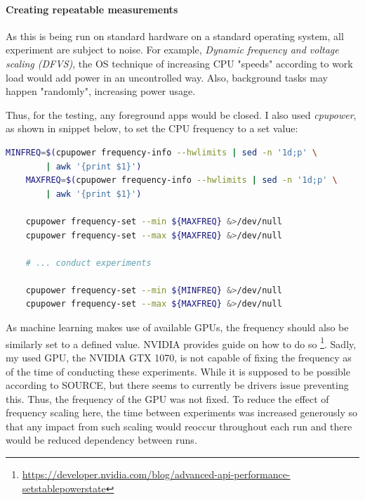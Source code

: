 \paragraph{Creating repeatable measurements}

As this is being run on standard hardware on a standard operating system, all experiment are subject to noise. 
For example, \emph{Dynamic frequency and voltage scaling (DFVS)}, the OS technique of increasing CPU "speeds" according to work load would add power in an uncontrolled way. Also, background tasks may happen "randomly", increasing power usage. 

Thus, for the testing, any foreground apps would be closed. I also used \emph{cpupower}, as shown in snippet below, to set the CPU frequency to a set value:

\begin{lstlisting}[language=bash, frame=single, numbers=none, caption={Used operating system information}, basicstyle=\ttfamily]
    MINFREQ=$(cpupower frequency-info --hwlimits | sed -n '1d;p' \
        | awk '{print $1}')
    MAXFREQ=$(cpupower frequency-info --hwlimits | sed -n '1d;p' \
        | awk '{print $1}')
    
    cpupower frequency-set --min ${MAXFREQ} &>/dev/null
    cpupower frequency-set --max ${MAXFREQ} &>/dev/null

    # ... conduct experiments

    cpupower frequency-set --min ${MINFREQ} &>/dev/null
    cpupower frequency-set --max ${MAXFREQ} &>/dev/null
\end{lstlisting}
\label{listing:setting_cpu_frequency}

As machine learning makes use of available GPUs, the frequency should also be similarly set to a defined value. 
NVIDIA provides guide on how to do so \footnote{\url{https://developer.nvidia.com/blog/advanced-api-performance-setstablepowerstate}}.
Sadly, my used GPU, the NVIDIA GTX 1070, is not capable of fixing the frequency as of the time of conducting these experiments. 
While it is supposed to be possible according to SOURCE, but there seems to currently be drivers issue preventing this. 
Thus, the frequency of the GPU was not fixed. 
To reduce the effect of frequency scaling here, the time between experiments was increased generously so that any impact from such scaling would reoccur throughout each run and there would be reduced dependency between runs.

